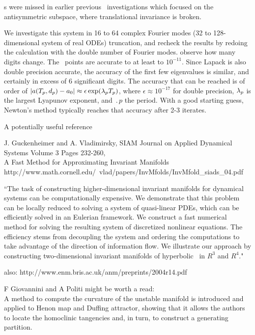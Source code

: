 {\Rpo s} were missed in earlier
previous \KS\ investigations%
which focused on the antisymmetric subspace, where translational invariance
is broken.

 We investigate this system in 16 to 64 complex Fourier modes (32 to
128-dimensional system of real ODEs) truncation, and recheck the results
by redoing the calculation with the double number of Fourier modes. %
observe how many digits change. The \eqv\ points are accurate to at least
to $10^{-11}$. Since Lapack is also double precision accurate, the
accuracy of the first few eigenvalues is similar, and certainly in excess
of 6 significant digits. %
The accuracy that can be reached is of order of
$|a({T_{p}},d_p) - a_0|
 \approx \epsilon \exp(\lambda_p {T_{p}})$,
 where $\epsilon \approx 10^{-17}$ for double precision, $\lambda_p$ is
the largest Lyapunov exponent, and $\period{p}$ the period.  With a good
starting guess, Newton's method typically reaches that accuracy after 2-3
iterates.

A potentially useful reference

J. Guckenheimer and A. Vladimirsky,
SIAM Journal on Applied Dynamical Systems
Volume 3 Pages 232-260,
\\
A Fast Method for Approximating Invariant Manifolds
\\
http://www.math.cornell.edu/~vlad/papers/InvMfolds/InvMfold\_siads\_04.pdf

``The task of constructing higher-dimensional invariant
manifolds for dynamical systems can be computationally
expensive. We demonstrate that this problem can be locally
reduced to solving a system of quasi-linear PDEs, which can be
efficiently solved in an Eulerian framework. We construct a
fast numerical method for solving the resulting system of
discretized nonlinear equations. The efficiency stems from
decoupling the system and ordering the computations to take
advantage of the direction of information flow. We illustrate
our approach by constructing two-dimensional invariant
manifolds of hyperbolic \eqva\ in $R^3$ and $R^4$."

also:
http://www.enm.bris.ac.uk/anm/preprints/2004r14.pdf

F Giovannini and A Politi might be worth a read:
\\
A method to compute the curvature of the unstable manifold is
introduced and applied to Henon map and Duffing attractor,
showing that it allows the authors to locate the homoclinic
tangencies and, in turn, to construct a generating partition.





